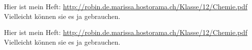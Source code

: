 \documentclass[12pt,a4paper,ngerman,numbers=noenddot,toc=listof]{scrartcl}
\newcommand{\Printtext}{%
Hier ist mein Heft: \url{http://robin.de.marissa.hostorama.ch/Klasse/12/Chemie.pdf} \\
Vielleicht können sie es ja gebrauchen.
}
\begin{document}
\Printtext

\bigskip\bigskip

\Printtext
\end{document}
